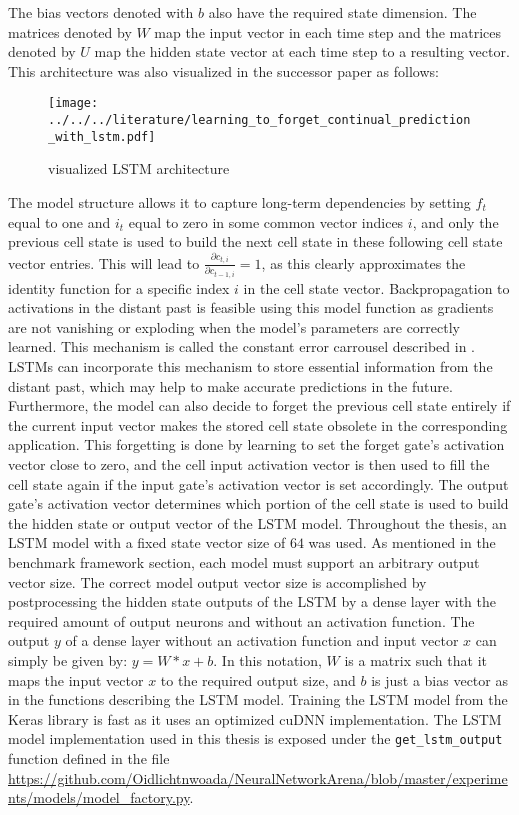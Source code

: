 \documentclass[draft,final]{vutinfth} %
\begin{document}
    The bias vectors denoted with $b$ also have the required state dimension.
    The matrices denoted by $W$ map the input vector in each time step and the matrices denoted by $U$ map the hidden state vector at each time step to a resulting vector.
    This architecture was also visualized in the successor paper as follows:
    \begin{figure}[H]
        \centering{}
        \texttt{[image: ../../../literature/learning\_to\_forget\_continual\_prediction\_with\_lstm.pdf]}
        \caption{visualized LSTM architecture \cite[p. 6]{LSTM_forget}}
        \label{fig:lstm_vis}
    \end{figure}
    The model structure allows it to capture long-term dependencies by setting $f_t$ equal to one and $i_t$ equal to zero in some common vector indices $i$, and only the previous cell state is used to build the next cell state in these following cell state vector entries.
    This will lead to $\frac{\partial{c_{t,i}}}{\partial{c_{t-1,i}}} = 1$, as this clearly approximates the identity function for a specific index $i$ in the cell state vector.
    Backpropagation to activations in the distant past is feasible using this model function as gradients are not vanishing or exploding when the model's parameters are correctly learned.
    This mechanism is called the constant error carrousel described in \cite[p. 7]{LSTM}.
    LSTMs can incorporate this mechanism to store essential information from the distant past, which may help to make accurate predictions in the future.
    Furthermore, the model can also decide to forget the previous cell state entirely if the current input vector makes the stored cell state obsolete in the corresponding application.
    This forgetting is done by learning to set the forget gate's activation vector close to zero, and the cell input activation vector is then used to fill the cell state again if the input gate's activation vector is set accordingly.
    The output gate's activation vector determines which portion of the cell state is used to build the hidden state or output vector of the LSTM model.
    Throughout the thesis, an LSTM model with a fixed state vector size of $64$ was used. As mentioned in the benchmark framework section, each model must support an arbitrary output vector size.
    The correct model output vector size is accomplished by postprocessing the hidden state outputs of the LSTM by a dense layer with the required amount of output neurons and without an activation function.
    The output $y$ of a dense layer without an activation function and input vector $x$ can simply be given by: $y = W*x + b$.
    In this notation, $W$ is a matrix such that it maps the input vector $x$ to the required output size, and $b$ is just a bias vector as in the functions describing the LSTM model.
    Training the LSTM model from the Keras library is fast as it uses an optimized cuDNN \cite{cuDNN} implementation.
    The LSTM model implementation used in this thesis is exposed under the \texttt{get\_lstm\_output} function defined in the file \url{https://github.com/Oidlichtnwoada/NeuralNetworkArena/blob/master/experiments/models/model_factory.py}.
\end{document}
